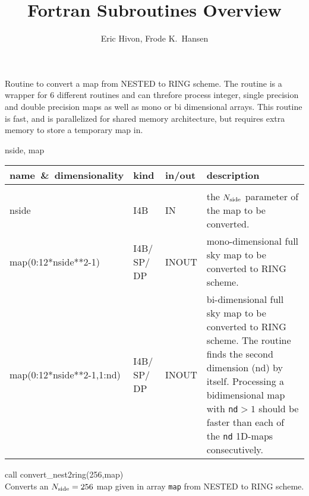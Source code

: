 
\sloppy


\title{\healpix Fortran Subroutines Overview}
 \section[convert\_nest2ring*]{ }
\label{sub:convert_nest2ring}
\author{Eric Hivon, Frode K.~Hansen}


\begin{facility}
{Routine to convert a \healpix map from NESTED to RING scheme. \newline
The routine is a
  wrapper for 6 different routines and can threfore process
  integer, single precision and double precision maps as well as mono or bi
  dimensional arrays. \newline This routine is fast, and is parallelized for shared memory
architecture, but requires extra memory to store a temporary map in. }
{\modPixTools}
\end{facility}

\begin{f90format}
{nside, map}
\end{f90format}

\begin{arguments}
{
\begin{tabular}{p{0.4\hsize} p{0.05\hsize} p{0.1\hsize} p{0.35\hsize}} \hline  
\textbf{name~\&~dimensionality} & \textbf{kind} & \textbf{in/out} & \textbf{description} \\ \hline
                   &   &   &                           \\ %
nside & I4B & IN & the ${N_{\rm side}}$ parameter of the map to be converted. \\
map(0:12*nside**2-1) & I4B/ SP/ DP & INOUT & mono-dimensional full sky map to be converted to RING scheme. \\
map(0:12*nside**2-1,1:nd) & I4B/ SP/ DP & INOUT & bi-dimensional full sky map to
                   be converted to RING scheme. The routine finds the second
                   dimension (nd) by itself. Processing a bidimensional map with
{\tt nd}$>1$ should be
                   faster than each of the {\tt nd} 1D-maps consecutively.
\end{tabular}
}
\end{arguments}

\begin{example}
{
call convert\_nest2ring(256,map)  \\
}
{
Converts an ${N_{\rm side}}=256$ map given in array {\tt map} from NESTED to RING scheme.
}
\end{example}

